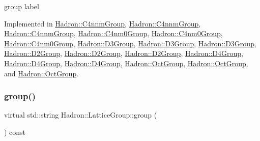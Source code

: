 group label 

Implemented in \mbox{\hyperlink{structHadron_1_1C4nnmGroup_a9f35739dbd3ad6effd0e675d40b5341d}{Hadron\+::\+C4nnm\+Group}}, \mbox{\hyperlink{structHadron_1_1C4nnmGroup_a9f35739dbd3ad6effd0e675d40b5341d}{Hadron\+::\+C4nnm\+Group}}, \mbox{\hyperlink{structHadron_1_1C4nnmGroup_a9f35739dbd3ad6effd0e675d40b5341d}{Hadron\+::\+C4nnm\+Group}}, \mbox{\hyperlink{structHadron_1_1C4nm0Group_a2a84060776245ed0045a7271b00064eb}{Hadron\+::\+C4nm0\+Group}}, \mbox{\hyperlink{structHadron_1_1C4nm0Group_a2a84060776245ed0045a7271b00064eb}{Hadron\+::\+C4nm0\+Group}}, \mbox{\hyperlink{structHadron_1_1C4nm0Group_a2a84060776245ed0045a7271b00064eb}{Hadron\+::\+C4nm0\+Group}}, \mbox{\hyperlink{structHadron_1_1D3Group_a60e24b1e2d17481b7ab94860c95ce155}{Hadron\+::\+D3\+Group}}, \mbox{\hyperlink{structHadron_1_1D3Group_a60e24b1e2d17481b7ab94860c95ce155}{Hadron\+::\+D3\+Group}}, \mbox{\hyperlink{structHadron_1_1D3Group_a60e24b1e2d17481b7ab94860c95ce155}{Hadron\+::\+D3\+Group}}, \mbox{\hyperlink{structHadron_1_1D2Group_aa6d99edf22f99550602f38437aadd890}{Hadron\+::\+D2\+Group}}, \mbox{\hyperlink{structHadron_1_1D2Group_aa6d99edf22f99550602f38437aadd890}{Hadron\+::\+D2\+Group}}, \mbox{\hyperlink{structHadron_1_1D2Group_aa6d99edf22f99550602f38437aadd890}{Hadron\+::\+D2\+Group}}, \mbox{\hyperlink{structHadron_1_1D4Group_ae6c08a58023532bcf277f60c1dddde4f}{Hadron\+::\+D4\+Group}}, \mbox{\hyperlink{structHadron_1_1D4Group_ae6c08a58023532bcf277f60c1dddde4f}{Hadron\+::\+D4\+Group}}, \mbox{\hyperlink{structHadron_1_1D4Group_ae6c08a58023532bcf277f60c1dddde4f}{Hadron\+::\+D4\+Group}}, \mbox{\hyperlink{structHadron_1_1OctGroup_a0d21b9bbc5cc2cafa4945e9dd5608a6b}{Hadron\+::\+Oct\+Group}}, \mbox{\hyperlink{structHadron_1_1OctGroup_a0d21b9bbc5cc2cafa4945e9dd5608a6b}{Hadron\+::\+Oct\+Group}}, and \mbox{\hyperlink{structHadron_1_1OctGroup_a0d21b9bbc5cc2cafa4945e9dd5608a6b}{Hadron\+::\+Oct\+Group}}.

\mbox{\label{structHadron_1_1LatticeGroup_a82208a322bf1b1db489f16af38e70087}} 
\subsubsection{\texorpdfstring{group()}{group()}\hspace{0.1cm}{\footnotesize\ttfamily [2/3]}}
{\footnotesize\ttfamily virtual std\+::string Hadron\+::\+Lattice\+Group\+::group (\begin{DoxyParamCaption}{ }\end{DoxyParamCaption}) const\hspace{0.3cm}{\ttfamily [pure virtual]}}

